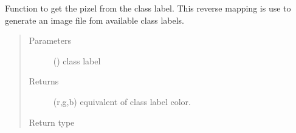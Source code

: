 \documentclass[letterpaper,10pt,english]{sphinxmanual}
\begin{document}
\begin{fulllineitems}
\label{\detokenize{pyleaf.basefunctions:pyleaf.basefunctions.getPixelFromLabel}}
Function to get the pizel from the class label. This reverse mapping is use to generate an image file fom available class labels.
\begin{quote}\begin{description}
\item[{Parameters}] \leavevmode
{} () \textendash{} class label

\item[{Returns}] \leavevmode
(r,g,b) equivalent of class label color.

\item[{Return type}] \leavevmode
{}

\end{description}\end{quote}

\end{fulllineitems}

\end{document}
